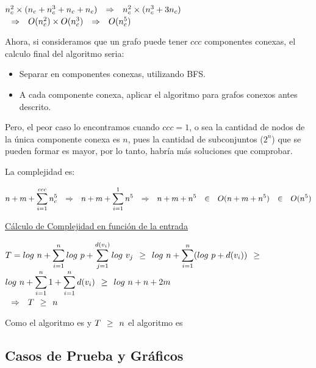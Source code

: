 \documentclass[a4paper, 10pt]{article}
\begin{document}
\begin{center}
	\ensuremath{n_c^2 \times (n_c + n_c^3 + n_c + n_c) \entonces n_c^2 \times (n_c^3 + 3n_c) } \\ \vspace*{1em}
	\ensuremath{ \entonces \ode{n_c^2} \times \ode{n_c^3} \entonces \ode{n_c^5}}
\end{center}

Ahora, si consideramos que un grafo puede tener $ccc$ componentes conexas, el calculo final del algoritmo seria:
\begin{itemize}
	\item Separar en componentes conexas, utilizando BFS. 
	\item A cada componente conexa, aplicar el algoritmo para grafos conexos antes descrito. 
\end{itemize}

Pero, el peor caso lo encontramos cuando $ccc = 1$, o sea la cantidad de nodos de la \'unica componente conexa es $n$, pues la cantidad de subconjuntos ($2^n$) que se pueden formar es mayor, por lo tanto, habr\'ia m\'as soluciones que comprobar.

La complejidad es:

\begin{center}
	\ensuremath{n + m + \zum{i=1}{ccc}{n_c^5} \entonces n + m + \zum{i=1}{1}{n^5} \entonces n + m + n^5 \pertenece \ode{n+m+n^5} \pertenece \ode{n^5}} \\ 
\end{center}

\vspace*{2em}
\underline{C\'alculo de Complejidad en funci\'on de la entrada}

\begin{center}
	\ensuremath{ T = log\ n + \zum{i=1}{n}{log\ p + \zum{j=1}{d(v_i)}{log\ v_j}} \mai log\ n + \zum{i=1}{n}{(log\ p + d(v_i))} \mai } \\
	\ensuremath{ log\ n + \zum{i=1}{n}{1} + \zum{i=1}{n}{d(v_i)} \mai log\ n + n + 2m} \\
	\vspace{1em}	
	\ensuremath{ \entonces T \mai n} \\
\end{center}

Como el algoritmo es  y $T \mai n$ \entonces el algoritmo es 

\newpage

\subsection{Casos de Prueba y Gr\'aficos}
\end{document}
